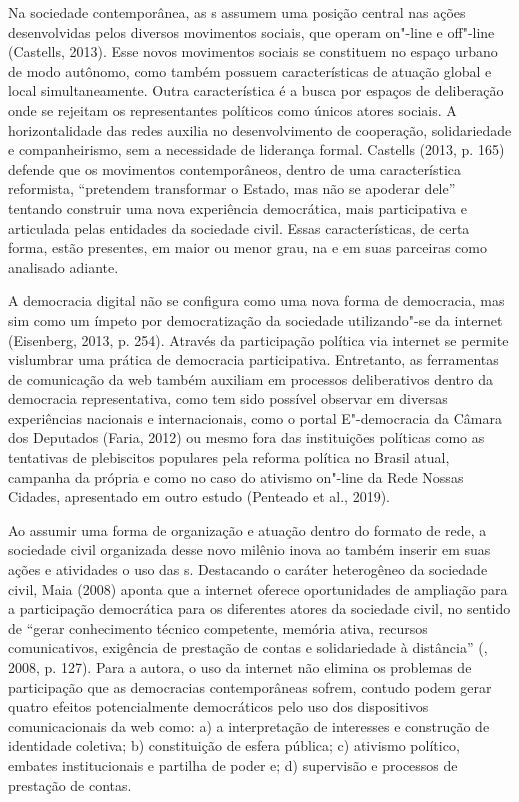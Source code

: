 Na sociedade contemporânea, as s assumem uma posição central nas
ações desenvolvidas pelos diversos movimentos sociais, que operam
on"-line e off"-line (Castells, 2013). Esse novos movimentos sociais se
constituem no espaço urbano de modo autônomo, como também possuem
características de atuação global e local simultaneamente. Outra
característica é a busca por espaços de deliberação onde se rejeitam os
representantes políticos como únicos atores sociais. A horizontalidade
das redes auxilia no desenvolvimento de cooperação, solidariedade e
companheirismo, sem a necessidade de liderança formal. Castells (2013,
p. 165) defende que os movimentos contemporâneos, dentro de uma
característica reformista, ``pretendem transformar o Estado, mas não se
apoderar dele'' tentando construir uma nova experiência democrática, mais
participativa e articulada pelas entidades da sociedade civil. Essas
características, de certa forma, estão presentes, em maior ou menor
grau, na  e em suas parceiras como analisado adiante.

A democracia digital não se configura como uma nova forma de democracia,
mas sim como um ímpeto por democratização da sociedade utilizando"-se da
internet (Eisenberg, 2013, p. 254). Através da participação política via
internet se permite vislumbrar uma prática de democracia participativa.
Entretanto, as ferramentas de comunicação da web também auxiliam em
processos deliberativos dentro da democracia representativa, como tem
sido possível observar em diversas experiências nacionais e
internacionais, como o portal E"-democracia da Câmara dos Deputados
(Faria, 2012) ou mesmo fora das instituições políticas como as
tentativas de plebiscitos populares pela reforma política no Brasil
atual, campanha da própria  e como no caso do ativismo on"-line da
Rede Nossas Cidades, apresentado em outro estudo (Penteado et al.,
2019).

Ao assumir uma forma de organização e atuação dentro do formato de rede,
a sociedade civil organizada desse novo milênio inova ao também inserir
em suas ações e atividades o uso das s. Destacando o caráter
heterogêneo da sociedade civil, Maia (2008) aponta que a internet
oferece oportunidades de ampliação para a participação democrática para
os diferentes atores da sociedade civil, no sentido de ``gerar
conhecimento técnico competente, memória ativa, recursos comunicativos,
exigência de prestação de contas e solidariedade à distância'' (,
2008, p. 127). Para a autora, o uso da internet não elimina os problemas
de participação que as democracias contemporâneas sofrem, contudo podem
gerar quatro efeitos potencialmente democráticos pelo uso dos
dispositivos comunicacionais da web como: a) a interpretação de
interesses e construção de identidade coletiva; b) constituição de
esfera pública; c) ativismo político, embates institucionais e partilha
de poder e; d) supervisão e processos de prestação de contas.

